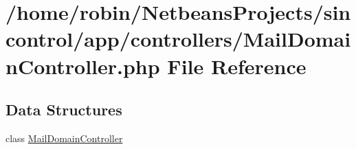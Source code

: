 \hypertarget{_mail_domain_controller_8php}{}\section{/home/robin/\+Netbeans\+Projects/sincontrol/app/controllers/\+Mail\+Domain\+Controller.php File Reference}
\label{_mail_domain_controller_8php}
\subsection*{Data Structures}
\begin{DoxyCompactItemize}
\item 
class \hyperlink{class_mail_domain_controller}{Mail\+Domain\+Controller}
\end{DoxyCompactItemize}
